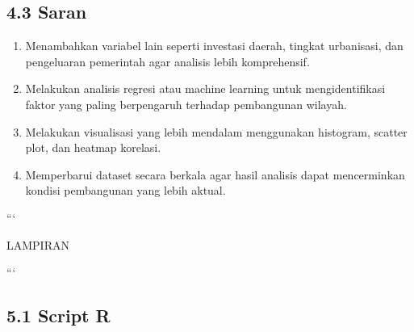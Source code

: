 \documentclass[
  12pt,
]{article}
\providecommand{\tightlist}{%
  \setlength{\itemsep}{0pt}\setlength{\parskip}{0pt}}
\begin{document}
\subsection{\texorpdfstring{\normalsize 4.3 \hspace {0,5cm}
Saran}{4.3  Saran}}\label{saran}

\vspace{-0.5cm}

\begin{enumerate}
\def\labelenumi{\arabic{enumi}.}
\tightlist
\item
  Menambahkan variabel lain seperti investasi daerah, tingkat
  urbanisasi, dan pengeluaran pemerintah agar analisis lebih
  komprehensif.
\item
  Melakukan analisis regresi atau machine learning untuk
  mengidentifikasi faktor yang paling berpengaruh terhadap pembangunan
  wilayah.
\item
  Melakukan visualisasi yang lebih mendalam menggunakan histogram,
  scatter plot, dan heatmap korelasi.
\item
  Memperbarui dataset secara berkala agar hasil analisis dapat
  mencerminkan kondisi pembangunan yang lebih aktual.
\end{enumerate}

\setcounter{page}{4}
\newpage

\begin{center}
{
\bfseries

```
\vfill

\Large

LAMPIRAN

```

}
\end{center}

\subsection{\texorpdfstring{\normalsize 5.1 \hspace {0,5cm} Script
R}{5.1  Script R}}\label{script-r}

\vspace{-0.5cm}
\end{document}
